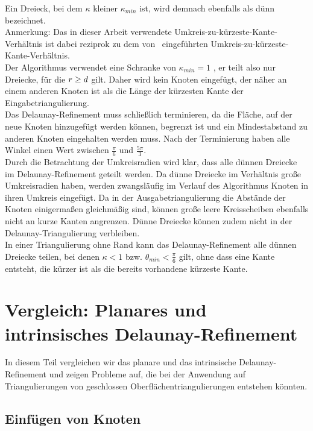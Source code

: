 Ein Dreieck, bei dem $\kappa$ kleiner $\kappa_{min}$ ist, wird demnach ebenfalls als dünn bezeichnet.\\

Anmerkung: Das in dieser Arbeit verwendete Umkreis-zu-kürzeste-Kante-Verhältnis ist dabei  reziprok zu dem  von~\citet{SHEWCHUK:2002:chuws} eingeführten Umkreis-zu-kürzeste-Kante-Verhältnis.\\ 


Der Algorithmus verwendet eine Schranke von $\kappa_{min} = 1 $ 
, er teilt also nur Dreiecke, für die $\umkreisradius* \geq \kuezesteKante*$ gilt. Daher wird kein Knoten eingefügt, der näher an einem anderen Knoten ist als die Länge der kürzesten Kante der Eingabetriangulierung.\\     

Das Delaunay-Refinement muss schließlich terminieren, da die Fläche, auf der neue Knoten hinzugefügt werden können, begrenzt ist und ein Mindestabstand zu anderen Knoten eingehalten werden muss. Nach der Terminierung haben alle Winkel einen Wert zwischen $\frac{\pi}{6}$ und $\frac{5\pi}{3}$.\\

Durch die Betrachtung der Umkreisradien wird klar, dass alle dünnen Dreiecke im  Delaunay-Refinement geteilt werden.
Da dünne Dreiecke im Verhältnis große Umkreisradien haben, werden zwangsläufig im Verlauf des Algorithmus Knoten in ihren Umkreis eingefügt. Da in der Ausgabetriangulierung die Abstände der Knoten einigermaßen gleichmäßig sind, können große leere Kreisscheiben ebenfalls nicht an kurze Kanten angrenzen. Dünne Dreiecke können zudem nicht in der Delaunay-Triangulierung verbleiben.\\    
In einer Triangulierung ohne Rand kann das Delaunay-Refinement alle dünnen Dreiecke teilen, bei denen $\kappa < 1$ bzw. $\theta_{min} < \frac{\pi}{6}$ gilt, ohne dass eine Kante entsteht, die kürzer ist als die bereits vorhandene kürzeste Kante.   

   
\chapter{Vergleich: Planares und intrinsisches Delaunay-Refinement}
In diesem Teil vergleichen wir das planare und das intrinsische Delaunay-Refinement und zeigen Probleme auf, die bei der Anwendung auf Triangulierungen von geschlossen Oberflächentriangulierungen entstehen könnten.   

\section*{Einfügen von Knoten}

